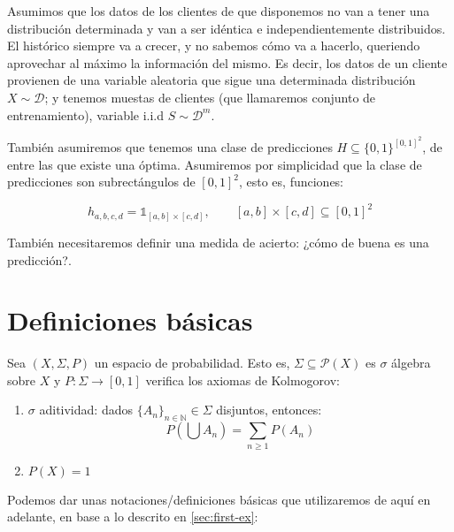 Asumimos que los datos de los clientes de que disponemos no van a tener una distribución determinada y
van a ser idéntica e independientemente distribuidos. El histórico siempre va a crecer, y no sabemos cómo va a hacerlo, queriendo aprovechar
al máximo la información del mismo. Es decir, los datos de un cliente provienen de una variable aleatoria que sigue una determinada
distribución $X \sim \mathcal{D}$; y tenemos muestas de clientes (que llamaremos conjunto de entrenamiento), variable i.i.d
$S \sim \mathcal{D}^m$. 

También asumiremos que tenemos una clase de predicciones $H \subseteq \{0,1\}^{[0,1]^2}$, de entre las que existe
una óptima. Asumiremos por simplicidad que la clase de predicciones son subrectángulos de $[0,1]^2$, esto es, funciones:

\[h_{a,b,c,d} = \mathds{1}_{[a,b]\times[c,d]}, \qquad [a,b]\times [c,d] \subseteq [0,1]^2\]


También necesitaremos definir una medida de acierto: ¿cómo de buena es una predicción?.

\section{Definiciones básicas}
Sea $(X, \Sigma, P)$ un espacio de probabilidad. Esto es, $\Sigma \subseteq \mathcal{P}(X)$ es $\sigma$ álgebra sobre $X$ y 
$P: \Sigma \rightarrow [0,1]$ verifica los axiomas de Kolmogorov:

\begin{enumerate}[i]
 \item $\sigma$ aditividad: dados $\{A_n\}_{n\in \mathbb{N}} \in \Sigma$ disjuntos, entonces: 
 \[P \left(\bigcup A_n\right) = \sum_{n\ge 1} P(A_n)\]
 \item $P(X) = 1$
\end{enumerate}

Podemos dar unas notaciones/definiciones básicas que utilizaremos de aquí en adelante, en base a lo descrito en \ref{sec:first-ex}:

